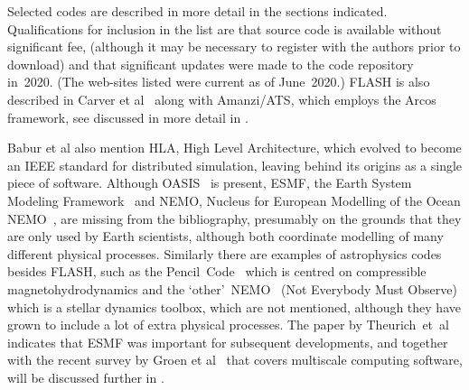 Selected codes are described in more detail in the sections indicated.
Qualifications for inclusion in the list are that source code is available without significant fee,
(although it may be necessary to register with the authors prior to download)
and that significant updates were made to the code repository in~2020.
(The web-sites listed were current as of June~2020.)
FLASH is also described in Carver et al~\cite[\S\,1]{carverhong} along with Amanzi/ATS, which
employs the Arcos framework, see \cite{Co16Mana} discussed in more detail in .

Babur et al also mention HLA, High Level Architecture, which evolved to 
become an IEEE standard for distributed simulation, leaving behind its origins as a single piece of software.
Although OASIS~\cite{Va13OASI} is present, ESMF, the Earth System Modeling
Framework~\cite{Hi04arch} and NEMO, Nucleus for European Modelling of the Ocean NEMO~\cite{nemowebsite},
are missing from the bibliography, presumably on the 
grounds that they are only used by Earth scientists, although both coordinate modelling of many
different physical processes. Similarly there are examples of astrophysics
codes besides FLASH, such as the Pencil~Code~\cite{pencilwebsite} which
is centred on compressible magnetohydrodynamics
and the `other'~NEMO~\cite{othernemowebsite} (Not Everybody Must Observe) which is a stellar dynamics toolbox,
which are not mentioned, although they have grown to include a lot of extra physical processes.
The paper by Theurich~et~al~\cite{Th16eart} indicates that
ESMF was important for subsequent developments,
and together with the recent survey by Groen et al~\cite{Gr19Mast} that
covers multiscale computing software, will be discussed further in .


